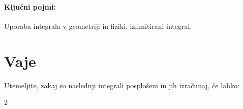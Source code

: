 \documentclass[11pt,a4paper]{exam}
\renewcommand{\{}{\lbrace}
\renewcommand{\}}{\rbrace}
\begin{document}
\paragraph{Ključni pojmi:} Uporaba integrala v geometriji in fiziki, izlimitirani integral.	
\section*{Vaje}
\begin{questions}
	\question Utemeljite, zakaj so naslednji integrali posplošeni in jih izračunaj, če lahko:
	\begin{multicols}{2}
	\end{multicols}


\end{questions}
\end{document}
